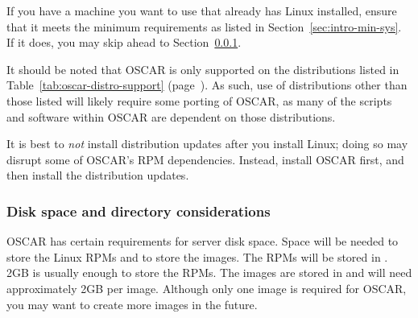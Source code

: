 If you have a machine you want to use that already has Linux
installed, ensure that it meets the minimum requirements as listed in
Section~\ref{sec:intro-min-sys}.  If it does, you may skip ahead to
Section~\ref{det:serverdiskpar}.

It should be noted that OSCAR is only supported on the distributions
listed in Table~\ref{tab:oscar-distro-support}
(page~\pageref{tab:oscar-distro-support}).  As such, use of
distributions other than those listed will likely require some porting
of OSCAR, as many of the scripts and software within OSCAR are
dependent on those distributions. 


It is best to {\em not} install distribution updates after you install
Linux; doing so may disrupt some of OSCAR's RPM dependencies.
Instead, install OSCAR first, and then install the distribution
updates.


\subsubsection{Disk space and directory considerations}
\label{det:serverdiskpar}

OSCAR has certain requirements for server disk space. Space will be
needed to store the Linux RPMs and to store the images.  The RPMs will
be stored in .  2GB is usually enough to store the
RPMs.  The images are stored in  and will
need approximately 2GB per image.  Although only one image is required
for OSCAR, you may want to create more images in the future.

